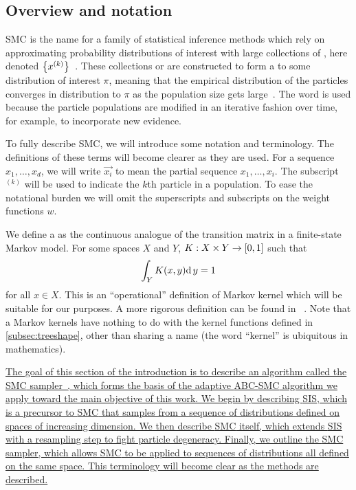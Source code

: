 
\subsection{Overview and notation}

\Gls{SMC} is the name for a family of statistical inference methods which rely
on approximating probability distributions of interest with large collections
of , here denoted
$\left\lbrace x^{(k)}\right\rbrace$~\autocite{doucet2000sequential, doucet2001introduction,
liu2008monte}. These collections or  are constructed to form
a  to some distribution of interest $\pi$,
meaning that the empirical distribution of the particles converges in
distribution to $\pi$ as the population size gets
large~\autocite{liu2001theoretical}. The word  is used because
the particle populations are modified in an iterative fashion over time, for
example, to incorporate new evidence. 

To fully describe \gls{SMC}, we will introduce some notation and terminology.
The definitions of these terms will become clearer as they are used. For a
sequence $x_1, \ldots, x_d$, we will write $\vec{x_i}$ to mean the partial
sequence $x_1, \ldots, x_i$. The subscript $^{(k)}$ will be used to indicate
the $k$th particle in a population. To ease the notational burden we will omit
the superscripts and subscripts on the weight functions $w$.

We define a  as the continuous analogue of the transition
matrix in a finite-state Markov model.  For some spaces $X$ and $Y$, $K : X
\times Y \to [0, 1]$ such that
\begin{align}
    \label{eq:mk}
    \int_Y K(x, y) \mathrm{d}\, y = 1
\end{align}
for all $x \in X$. This is an ``operational'' definition of Markov kernel which
will be suitable for our purposes. A more rigorous definition can be found in
\eg~\autocite{kallenberg2006foundations}. Note that a Markov kernels have
nothing to do with the kernel functions defined in \cref{subsec:treeshape},
other than sharing a name (the word ``kernel'' is ubiquitous in mathematics).

{\color{blue}\uline{
The goal of this section of the introduction is to describe an algorithm called
the \gls{SMC} sampler~\autocite{del2006sequential}, which forms the basis of
the adaptive \gls{ABC}-\gls{SMC} algorithm we apply toward the main objective
of this work. We begin by describing \gls{SIS}, which is a precursor to
\gls{SMC} that samples from a sequence of distributions defined on spaces of
increasing dimension. We then describe \gls{SMC} itself, which extends
\gls{SIS} with a resampling step to fight particle degeneracy. Finally, we
outline the \gls{SMC} sampler, which allows \gls{SMC} to be applied to
sequences of distributions all defined on the same space. This terminology will
become clear as the methods are described.
}}

